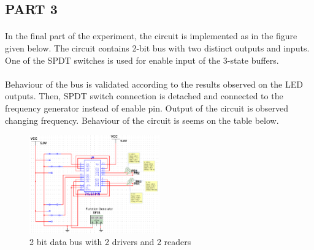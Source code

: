 \documentclass[pdftex,12pt,a4paper]{article}
\begin{document}
\newpage
\begin{flushleft}
\subsection{PART 3}

\paragraph{}
In the final part of the experiment, the circuit is implemented as in the figure given below. The circuit contains 2-bit bus with two distinct outputs and inputs. One of the SPDT switches is used for enable input of the 3-state buffers.

\paragraph{}
Behaviour of the bus is validated according to the results observed on the LED outputs. Then, SPDT switch connection is detached and connected to the frequency generator instead of enable pin. Output of the circuit is observed changing frequency. Behaviour of the circuit is seems on the table below.


\end{flushleft}

\begin{figure}[!h]
	\centering
	\includegraphics[width=0.5\textwidth]{part3.png}	
	\caption{2 bit data bus with 2 drivers and 2 readers}
	\label{circ:part3}
\end{figure}
\end{document}
